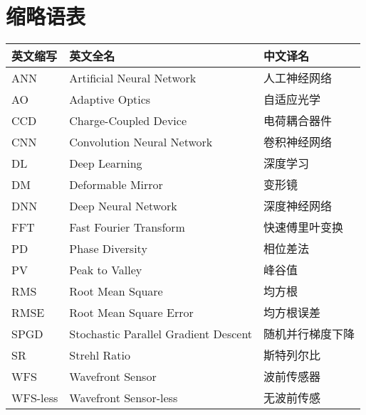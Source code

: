 
\chapter*{缩略语表}
\begin{table}[htb]
  \centering
  \renewcommand{\arraystretch}{1.25} %
  \begin{tabular}{lll}
    \toprule
    英文缩写     & 英文全名                                 & 中文译名     \\
    \midrule
    ANN      & Artificial Neural Network            & 人工神经网络   \\
    AO       & Adaptive Optics                      & 自适应光学    \\
    CCD      & Charge-Coupled Device                & 电荷耦合器件   \\
    CNN      & Convolution Neural Network           & 卷积神经网络   \\
    DL       & Deep Learning                        & 深度学习     \\
    DM       & Deformable Mirror                    & 变形镜      \\
    DNN      & Deep Neural Network                  & 深度神经网络   \\
    FFT      & Fast Fourier Transform               & 快速傅里叶变换  \\
    PD       & Phase Diversity                      & 相位差法     \\
    PV       & Peak to Valley                       & 峰谷值      \\
    RMS      & Root Mean Square                     & 均方根      \\
    RMSE     & Root Mean Square Error               & 均方根误差    \\
    SPGD     & Stochastic Parallel Gradient Descent & 随机并行梯度下降 \\
    SR       & Strehl Ratio                         & 斯特列尔比    \\
    WFS      & Wavefront Sensor                     & 波前传感器    \\
    WFS-less & Wavefront Sensor-less                & 无波前传感    \\
    \bottomrule
  \end{tabular}
\end{table}


